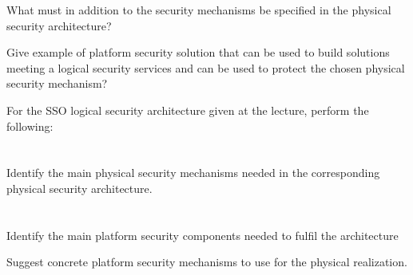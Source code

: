 \begin{questions}
\item What must in addition to the security mechanisms be specified in the physical security architecture?
\item Give example of platform security solution that can be used to build solutions meeting a logical security services and can be used to protect the chosen physical security mechanism?
\item For the SSO logical security architecture given at the lecture, perform the following:
  \begin{parts}
  \part{} Identify the main physical security mechanisms needed in the corresponding physical security architecture.
  \part{} Identify the main platform security components needed to fulfil the architecture
    \begin{subparts}
    \subpart{} Suggest concrete platform security mechanisms to use for the physical realization.
    \end{subparts}
  \end{parts}
\end{questions}

